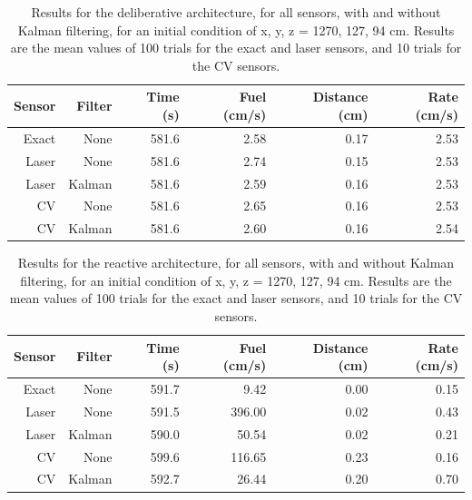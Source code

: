 \documentclass[journal, 10pt]{IEEEtran}
\begin{document}
\begin{table}
\centering
\normalsize
\caption{\label{delib_comparisons}Results for the deliberative architecture, for all sensors, with and without Kalman filtering, for an initial condition of x, y, z = 1270, 127, 94 cm. Results are the mean values of 100 trials for the exact and laser sensors, and 10 trials for the CV sensors.}
\begin{tabular}{r r | r r r r }
\toprule
Sensor & Filter & Time (s) & Fuel (cm/s) & Distance (cm) & Rate (cm/s)   \\
\midrule
 Exact &   None &    581.6 &        2.58 &          0.17 &        2.53   \\
 Laser &   None &    581.6 &        2.74 &          0.15 &        2.53   \\
 Laser & Kalman &    581.6 &        2.59 &          0.16 &        2.53   \\
    CV &   None &    581.6 &        2.65 &          0.16 &        2.53   \\
    CV & Kalman &    581.6 &        2.60 &          0.16 &        2.54   \\
\bottomrule
\end{tabular}
\end{table}

\begin{table}
\centering
\normalsize
\caption{\label{react_comparisons}Results for the reactive architecture, for all sensors, with and without Kalman filtering, for an initial condition of x, y, z = 1270, 127, 94 cm. Results are the mean values of 100 trials for the exact and laser sensors, and 10 trials for the CV sensors.}
\begin{tabular}{r r | r r r r }
\toprule
Sensor & Filter & Time (s) & Fuel (cm/s) & Distance (cm) & Rate (cm/s) \\
\midrule
 Exact &   None &    591.7 &        9.42 &          0.00 &        0.15 \\
 Laser &   None &    591.5 &      396.00 &          0.02 &        0.43 \\
 Laser & Kalman &    590.0 &       50.54 &          0.02 &        0.21 \\
    CV &   None &    599.6 &      116.65 &          0.23 &        0.16 \\
    CV & Kalman &    592.7 &       26.44 &          0.20 &        0.70 \\
\bottomrule
\end{tabular}
\end{table}
\end{document}
